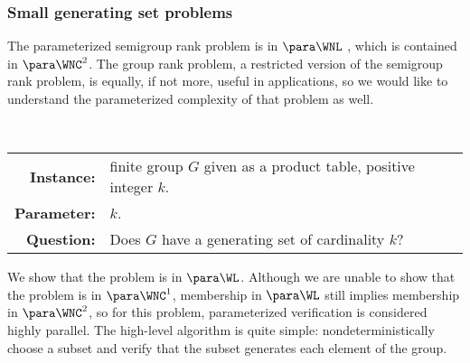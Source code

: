 \subsubsection{Small generating set problems}

%
%
%
The parameterized semigroup rank problem is in $\para \WNL$ \autocite[Theorem~3.12]{est15}, which is contained in $\para \WNC^2$.
%
%
%
The group rank problem, a restricted version of the semigroup rank problem, is equally, if not more, useful in applications, so we would like to understand the parameterized complexity of that problem as well.

\begin{definition}[$\pgrouprank$]
  \mbox{} \\
  \begin{tabular}{r p{9.2cm}}
    \textbf{Instance:} & finite group $G$ given as a product table, positive integer $k$. \\
    \textbf{Parameter:} & $k$. \\
    \textbf{Question:} & Does $G$ have a generating set of cardinality $k$?
  \end{tabular}
\end{definition}

%
%
%
We show that the problem is in $\para \WL$.
%
%
%
%
%
%
%
%
%
%
Although we are unable to show that the problem is in $\para \WNC^1$, membership in $\para \WL$ still implies membership in $\para \WNC^2$, so for this problem, parameterized verification is considered highly parallel.
The high-level algorithm is quite simple: nondeterministically choose a subset and verify that the subset generates each element of the group.
%
%


